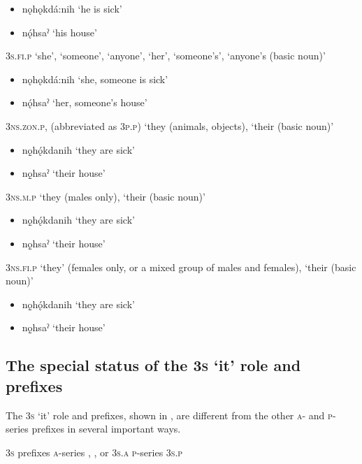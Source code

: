 \begin{itemize}
    \item  {}nǫhǫkdá:nih ‘he is sick’
    \item  {}nǫ́hsaˀ ‘his house’
\end{itemize}
\ex \textsc{3s.fi.p} ‘she’, ‘someone’, ‘anyone’, ‘her’, ‘someone’s’, ‘anyone’s (basic noun)’
\begin{itemize}
    \item   {}nǫhǫkdá:nih ‘she, someone is sick’
    \item  {}nǫ́hsaˀ ‘her, someone’s house’
\end{itemize}
\ex \textsc{3ns.zon.p}, (abbreviated as \textsc{3p.p}) ‘they (animals, objects), ‘their (basic noun)’
\begin{itemize}
    \item   {}nǫ̱hǫ́kdanih ‘they are sick’
    \item   {}nǫ̱hsaˀ ‘their house’
\end{itemize}
\ex \textsc{3ns.m.p} ‘they (males only), ‘their (basic noun)’
\begin{itemize}
    \item  {}nǫ̱hǫ́kdanih ‘they are sick’
    \item  {}nǫ̱hsaˀ ‘their house’
\end{itemize}
\ex \textsc{3ns.fi.p} ‘they’ (females only, or a mixed group of males and females), ‘their (basic noun)’
\begin{itemize}
    \item   {}nǫ̱hǫ́kdanih ‘they are sick’
    \item   {}nǫ̱hsaˀ ‘their house’
\end{itemize}
\z
\z



\subsection{The special status of the \textsc{3s} ‘it’ role and prefixes} \label{The special status of the neuter singular ‘it’ role and prefixes}
The \textsc{3s} ‘it’ role and prefixes, shown in , are different from the other \textsc{a}- and \textsc{p}-series prefixes in several important ways. 

\ea\label{ex:haho400} \textsc{3s} prefixes
\ea \textsc{a}-series , ,  or  \textsc{3s.a}
\ex \textsc{p}-series  \textsc{3s.p}
\z
\z


